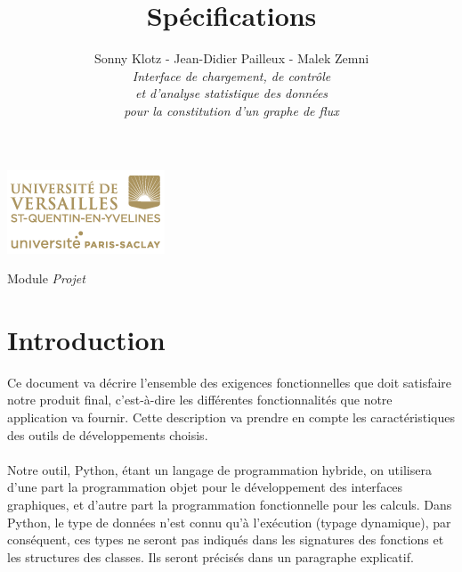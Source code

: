 

\title{\vspace{\fill}\textbf{\Huge Spécifications}}
\author{
	Sonny Klotz - Jean-Didier Pailleux - Malek Zemni
	\vspace{2em}\\
	\textit{Interface de chargement, de contrôle}\\\textit{et d’analyse statistique des données}\\\textit{pour la constitution d’un graphe de flux}
	\vspace{2em}
}


\clearpage
\maketitle\vspace{8em}
\begin{center}\includegraphics[scale=0.7]{../Cahier/logo.png}\end{center}
\begin{flushright}Module \textit{Projet}\end{flushright}
\newpage
\tableofcontents
\newpage\clearpage{}

	\section*{Introduction}
		Ce document va décrire l'ensemble des exigences fonctionnelles que doit satisfaire notre produit final, c'est-à-dire les différentes fonctionnalités que notre application va fournir. Cette description va prendre en compte les caractéristiques des outils de développements choisis.
		\paragraph{}Notre outil, Python, étant un langage de programmation hybride, on utilisera d'une part la programmation objet pour le développement des interfaces graphiques, et d'autre part la programmation fonctionnelle pour les calculs. Dans Python, le type de données n'est connu qu'à l'exécution (typage dynamique), par conséquent, ces types ne seront pas indiqués dans les signatures des fonctions et les structures des classes. Ils seront précisés dans un paragraphe explicatif.
